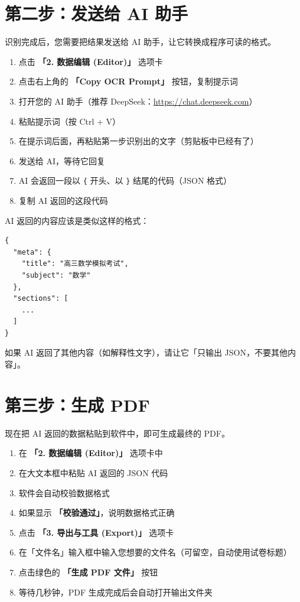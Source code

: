 \documentclass[UTF8,zihao=-4,openany]{ctexbook}
\begin{document}
\section{第二步：发送给 AI 助手}

识别完成后，您需要把结果发送给 AI 助手，让它转换成程序可读的格式。

\begin{StepBox}[操作步骤]
	\begin{enumerate}
		\item 点击 \textbf{「2. 数据编辑 (Editor)」} 选项卡
		\item 点击右上角的 \textbf{「Copy OCR Prompt」} 按钮，复制提示词
		\item 打开您的 AI 助手（推荐 DeepSeek：\url{https://chat.deepseek.com}）
		\item 粘贴提示词（按 Ctrl + V）
		\item 在提示词后面，再粘贴第一步识别出的文字（剪贴板中已经有了）
		\item 发送给 AI，等待它回复
		\item AI 会返回一段以 \texttt{\{} 开头、以 \texttt{\}} 结尾的代码（JSON 格式）
		\item 复制 AI 返回的这段代码
	\end{enumerate}
\end{StepBox}

\begin{TipBox}
	AI 返回的内容应该是类似这样的格式：
	\begin{lstlisting}
{
  "meta": {
    "title": "高三数学模拟考试",
    "subject": "数学"
  },
  "sections": [
    ...
  ]
}
\end{lstlisting}
	如果 AI 返回了其他内容（如解释性文字），请让它「只输出 JSON，不要其他内容」。
\end{TipBox}

\section{第三步：生成 PDF}

现在把 AI 返回的数据粘贴到软件中，即可生成最终的 PDF。

\begin{StepBox}[操作步骤]
	\begin{enumerate}
		\item 在 \textbf{「2. 数据编辑 (Editor)」} 选项卡中
		\item 在大文本框中粘贴 AI 返回的 JSON 代码
		\item 软件会自动校验数据格式
		\item 如果显示 \textcolor{green!50!black}{\textbf{「校验通过」}}，说明数据格式正确
		\item 点击 \textbf{「3. 导出与工具 (Export)」} 选项卡
		\item 在「文件名」输入框中输入您想要的文件名（可留空，自动使用试卷标题）
		\item 点击绿色的 \textbf{「生成 PDF 文件」} 按钮
		\item 等待几秒钟，PDF 生成完成后会自动打开输出文件夹
	\end{enumerate}
\end{StepBox}
\end{document}
